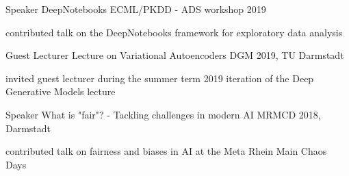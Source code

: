 \begin{cventries}

  \cventry
    {Speaker} %
    {DeepNotebooks} %
    {ECML/PKDD - ADS workshop 2019} %
    {} %
    {
      \begin{cvitems} %
        \item {contributed talk on the DeepNotebooks framework for exploratory data analysis}
      \end{cvitems}
    }

  \cventry
    {Guest Lecturer} %
    {Lecture on Variational Autoencoders} %
    {DGM 2019, TU Darmstadt} %
    {} %
    {
      \begin{cvitems} %
        \item {invited guest lecturer during the summer term 2019 iteration of the Deep Generative Models lecture}
      \end{cvitems}
    }

  \cventry
    {Speaker} %
    {What is "fair"? - Tackling challenges in modern AI} %
    {MRMCD 2018, Darmstadt} %
    {} %
    {
      \begin{cvitems} %
        \item {contributed talk on fairness and biases in AI at the Meta Rhein Main Chaos Days}
      \end{cvitems}
    }


\end{cventries}

